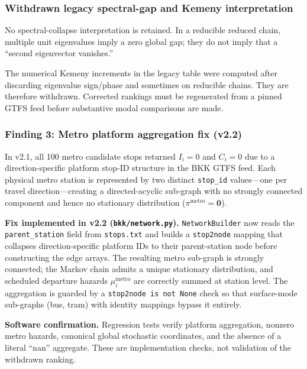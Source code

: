 \documentclass[11pt,a4paper]{article}
\theoremstyle{plain}
\theoremstyle{definition}
\theoremstyle{remark}
\begin{document}
\subsubsection{Withdrawn legacy spectral-gap and Kemeny interpretation}
\label{sec:finding2}

No spectral-collapse interpretation is retained.  In a reducible reduced
chain, multiple unit eigenvalues imply a zero global gap; they do not imply
that a ``second eigenvector vanishes.''

The numerical Kemeny increments in the legacy table were computed after
discarding eigenvalue sign/phase and sometimes on reducible chains.  They are
therefore withdrawn.  Corrected rankings must be regenerated from a pinned
GTFS feed before substantive modal comparisons are made.

\subsubsection{Finding 3: Metro platform aggregation fix (v2.2)}
\label{sec:metro-fix}

In v2.1, all 100 metro candidate stops returned $I_i=0$ and $C_i=0$ due to a
direction-specific platform stop-ID structure in the BKK GTFS feed.  Each
physical metro station is represented by two distinct \texttt{stop\_id}
values---one per travel direction---creating a directed-acyclic sub-graph
with no strongly connected component and hence no stationary distribution
($\pi^{\mathrm{metro}}=\mathbf{0}$).

\textbf{Fix implemented in v2.2 (\texttt{bkk/network.py}).}
\texttt{NetworkBuilder} now reads the \texttt{parent\_station} field from
\texttt{stops.txt} and builds a \texttt{stop2node} mapping that collapses
direction-specific platform IDs to their parent-station node before
constructing the edge arrays.  The resulting metro sub-graph is strongly
connected; the Markov chain admits a unique stationary distribution, and
scheduled departure hazards $\mu^{\mathrm{metro}}_i$ are correctly summed at
station level.  The aggregation is guarded by a \texttt{stop2node is not None}
check so that surface-mode sub-graphs (bus, tram) with identity mappings
bypass it entirely.

\textbf{Software confirmation.}  Regression tests verify platform aggregation,
nonzero metro hazards, canonical global stochastic coordinates, and the
absence of a literal ``nan'' aggregate.  These are implementation checks, not
validation of the withdrawn ranking.
\end{document}
